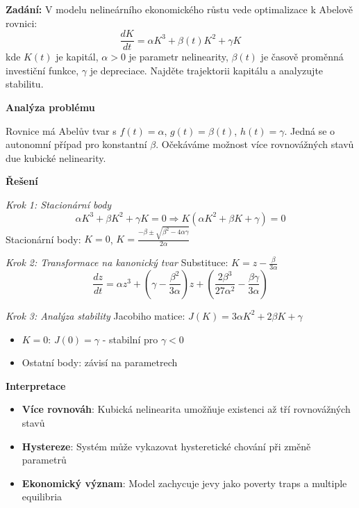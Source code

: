 \begin{example}
\label{ex:rust-ekonomie}

\noindent\textbf{Zadání:} V modelu nelineárního ekonomického růstu vede optimalizace k Abelově rovnici:
\[
\frac{dK}{dt} = \alpha K^3 + \beta(t) K^2 + \gamma K
\]
kde $K(t)$ je kapitál, $\alpha > 0$ je parametr nelinearity, $\beta(t)$ je časově proměnná investiční funkce, $\gamma$ je depreciace. Najděte trajektorii kapitálu a analyzujte stabilitu.

\vspace{1.5\baselineskip}

\noindent\textbf{Analýza problému}

Rovnice má Abelův tvar s $f(t) = \alpha$, $g(t) = \beta(t)$, $h(t) = \gamma$. Jedná se o autonomní případ pro konstantní $\beta$. Očekáváme možnost více rovnovážných stavů due kubické nelinearity.

\vspace{1.5\baselineskip}

\noindent\textbf{Řešení}

\noindent\textit{Krok 1: Stacionární body}
\[
\alpha K^3 + \beta K^2 + \gamma K = 0 \Rightarrow K(\alpha K^2 + \beta K + \gamma) = 0
\]
Stacionární body: $K = 0$, $K = \frac{-\beta \pm \sqrt{\beta^2 - 4\alpha\gamma}}{2\alpha}$

\vspace{1\baselineskip}

\noindent\textit{Krok 2: Transformace na kanonický tvar}
Substituce: $K = z - \frac{\beta}{3\alpha}$
\[
\frac{dz}{dt} = \alpha z^3 + \left(\gamma - \frac{\beta^2}{3\alpha}\right)z + \left(\frac{2\beta^3}{27\alpha^2} - \frac{\beta\gamma}{3\alpha}\right)
\]

\vspace{1\baselineskip}

\noindent\textit{Krok 3: Analýza stability}
Jacobiho matice: $J(K) = 3\alpha K^2 + 2\beta K + \gamma$
\begin{itemize}
\item $K = 0$: $J(0) = \gamma$ - stabilní pro $\gamma < 0$
\item Ostatní body: závisí na parametrech
\end{itemize}

\vspace{1.5\baselineskip}

\noindent\textbf{Interpretace}
\begin{itemize}
\item \textbf{Více rovnováh}: Kubická nelinearita umožňuje existenci až tří rovnovážných stavů
\item \textbf{Hystereze}: Systém může vykazovat hysteretické chování při změně parametrů
\item \textbf{Ekonomický význam}: Model zachycuje jevy jako poverty traps a multiple equilibria
\end{itemize}

\end{example}

